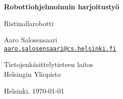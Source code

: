\begin{titlepage}
    \begin{center}

        {\Large \bfseries Robottiohjelmoinnin harjoitustyö}

        \vspace{\baselineskip}

        {\large Ristinollarobotti}


        \vspace{2\baselineskip}

        {\large Aaro Salosensaari}\\
        {\small{ \texttt{\href{mailto:aaro.salosensaari@cs.helsinki.fi}{aaro.salosensaari@cs.helsinki.fi}}}}


        \vfill

        {\large
            Tietojenkäsittelytieteen laitos\\
            Helsingin Yliopisto
        }

        \vspace{2\baselineskip}

        {\large Helsinki, \today}
    \end{center}
\end{titlepage}
